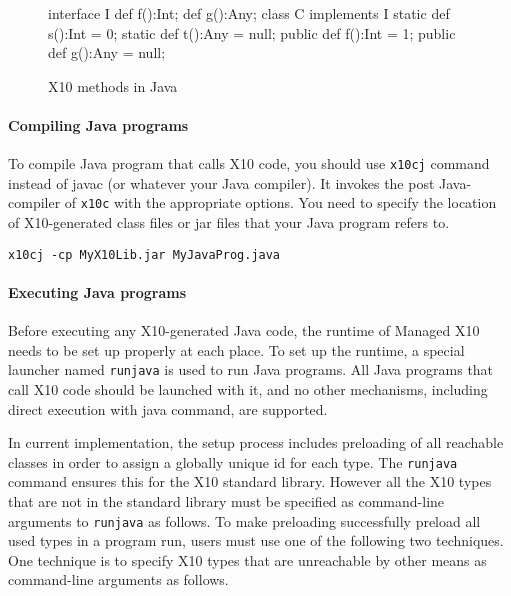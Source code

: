 \begin{figure}
\begin{xten}
interface I {
  def f():Int;
  def g():Any;
}
class C implements I {
  static def s():Int = 0;
  static def t():Any = null;
  public def f():Int = 1;
  public def g():Any = null;
}
\end{xten}
\caption{X10 methods in Java}
\label{fig:methods}
\end{figure}


\paragraph{Compiling Java programs}

To compile Java program that calls X10 code, you should use
\verb|x10cj| command instead of javac (or whatever your Java
compiler). It invokes the post Java-compiler of \verb|x10c| with the
appropriate options. You need to specify the location of X10-generated
class files or jar files that your Java program refers to.

\verb|x10cj -cp MyX10Lib.jar MyJavaProg.java|


\paragraph{Executing Java programs}

Before executing any X10-generated Java code, the runtime of Managed
X10 needs to be set up properly at each place.  To set up the runtime,
a special launcher named \verb|runjava| is used to run Java programs.
All Java programs that call X10 code should be launched with it, and
no other mechanisms, including direct execution with java command, are
supported.

In current implementation, the setup process includes preloading of
all reachable classes in order to assign a globally unique id for each
type.  The \verb|runjava| command ensures this for the X10 standard
library. However all the X10 types that are not in the standard
library must be specified as command-line arguments to \verb|runjava|
as follows.  To make preloading successfully preload all used types in
a program run, users must use one of the following two techniques.
One technique is to specify X10 types that are unreachable by other
means as command-line arguments as follows.

